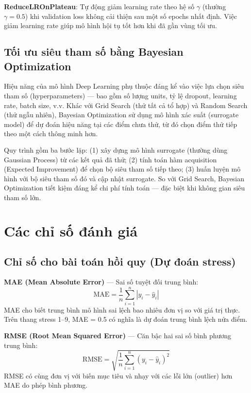 \textbf{ReduceLROnPlateau}: Tự động giảm learning rate theo hệ số $\gamma$ (thường $\gamma = 0.5$) khi validation loss không cải thiện sau một số epochs nhất định. Việc giảm learning rate giúp mô hình hội tụ tốt hơn khi đã gần vùng tối ưu.

\subsection{Tối ưu siêu tham số bằng Bayesian Optimization}

Hiệu năng của mô hình Deep Learning phụ thuộc đáng kể vào việc lựa chọn siêu tham số (hyperparameters) — bao gồm số lượng units, tỷ lệ dropout, learning rate, batch size, v.v. Khác với Grid Search (thử tất cả tổ hợp) và Random Search \cite{bergstra2012random} (thử ngẫu nhiên), Bayesian Optimization \cite{snoek2012practical} sử dụng mô hình xác suất (surrogate model) để dự đoán hiệu năng tại các điểm chưa thử, từ đó chọn điểm thử tiếp theo một cách thông minh hơn.

Quy trình gồm ba bước lặp: (1) xây dựng mô hình surrogate (thường dùng Gaussian Process) từ các kết quả đã thử; (2) tính toán hàm acquisition (Expected Improvement) để chọn bộ siêu tham số tiếp theo; (3) huấn luyện mô hình với bộ siêu tham số đó và cập nhật surrogate. So với Grid Search, Bayesian Optimization tiết kiệm đáng kể chi phí tính toán — đặc biệt khi không gian siêu tham số lớn.


\section{Các chỉ số đánh giá}
\label{sec:metrics}

\subsection{Chỉ số cho bài toán hồi quy (Dự đoán stress)}

\textbf{MAE (Mean Absolute Error)} — Sai số tuyệt đối trung bình:
\begin{equation}
    \text{MAE} = \frac{1}{n}\sum_{i=1}^{n}|y_i - \hat{y}_i|
\end{equation}
MAE cho biết trung bình mô hình sai lệch bao nhiêu đơn vị so với giá trị thực. Trên thang stress 1--9, MAE = 0.5 có nghĩa là dự đoán trung bình lệch nửa điểm.

\textbf{RMSE (Root Mean Squared Error)} — Căn bậc hai sai số bình phương trung bình:
\begin{equation}
    \text{RMSE} = \sqrt{\frac{1}{n}\sum_{i=1}^{n}(y_i - \hat{y}_i)^2}
\end{equation}
RMSE có cùng đơn vị với biến mục tiêu và nhạy với các lỗi lớn (outlier) hơn MAE do phép bình phương.

